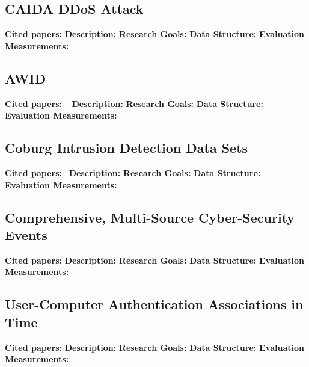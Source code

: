 \subsection{CAIDA DDoS Attack}
\textbf{Cited papers:} \newline
\textbf{Description:} \newline
\textbf{Research Goals:}  \newline
\textbf{Data Structure:} \newline
\textbf{Evaluation Measurements:} \newline

\subsection{AWID}
\textbf{Cited papers:} ~\cite{kolias2016intrusion}\newline
\textbf{Description:} \newline
\textbf{Research Goals:}  \newline
\textbf{Data Structure:} \newline
\textbf{Evaluation Measurements:} \newline

\subsection{Coburg Intrusion Detection Data Sets}
\textbf{Cited papers:}~\cite{ring2017flow} \newline
\textbf{Description:} \newline
\textbf{Research Goals:}  \newline
\textbf{Data Structure:} \newline
\textbf{Evaluation Measurements:} \newline

\subsection{Comprehensive, Multi-Source Cyber-Security Events}
\textbf{Cited papers:} \newline
\textbf{Description:} \newline
\textbf{Research Goals:}  \newline
\textbf{Data Structure:} \newline
\textbf{Evaluation Measurements:} \newline

\subsection{User-Computer Authentication Associations in Time}
\textbf{Cited papers:} \newline
\textbf{Description:} \newline
\textbf{Research Goals:}  \newline
\textbf{Data Structure:} \newline
\textbf{Evaluation Measurements:} \newline

